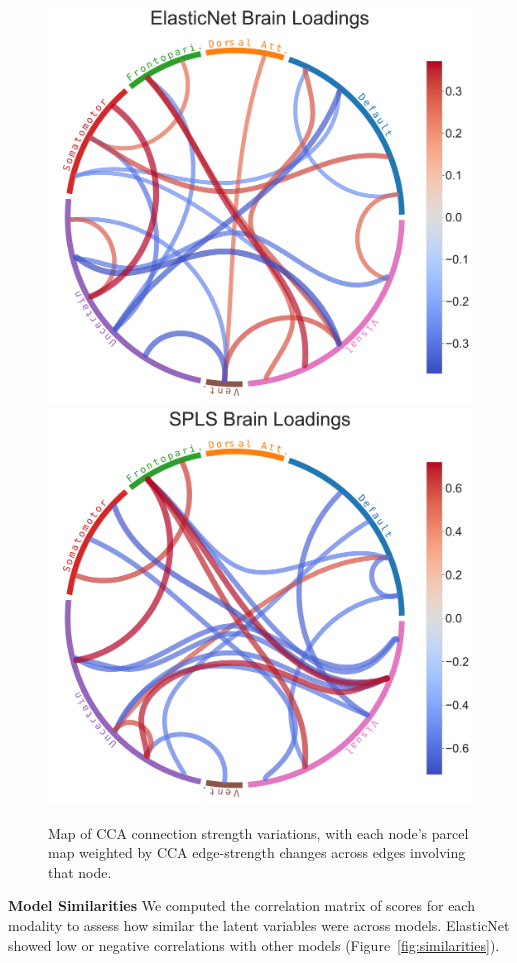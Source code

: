 \begin{figure}
\includegraphics[width=0.72\linewidth]{figures/regularization/hcp/ElasticNet brain loadings.pdf}
\includegraphics[width=0.72\linewidth]{figures/regularization/hcp/SPLS brain loadings.pdf}
\caption*{Map of CCA connection strength variations, with each node’s parcel map weighted by CCA edge-strength changes across edges involving that node.}
\label{fig:brain}
\end{figure}

\textbf{Model Similarities}
We computed the correlation matrix of scores for each modality to assess how similar the latent variables were across models.
ElasticNet showed low or negative correlations with other models (Figure~\ref{fig:similarities}).

